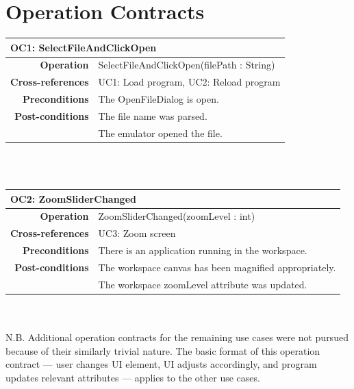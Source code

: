\documentclass[12pt]{article}
\begin{document}
\section{Operation Contracts}
\begin{tabular*}{\textwidth}{r | l}
  \multicolumn{2}{l}{\textbf{OC1: SelectFileAndClickOpen}} \\ \hline
  \textbf{Operation} & SelectFileAndClickOpen(filePath : String) \\
  \textbf{Cross-references} & UC1: Load  program, UC2: Reload program \\
  \textbf{Preconditions} & The OpenFileDialog is open. \\
  \textbf{Post-conditions} & The file name was parsed. \\
                            & The emulator opened the file. \\ \hline
\end{tabular*} \\\\

\begin{tabular*}{\textwidth}{r | l}
  \multicolumn{2}{l}{\textbf{OC2: ZoomSliderChanged}} \\ \hline
  \textbf{Operation} & ZoomSliderChanged(zoomLevel : int) \\
  \textbf{Cross-references} & UC3: Zoom screen \\
  \textbf{Preconditions} & There is an application running in the workspace. \\
  \textbf{Post-conditions} & The workspace canvas has been magnified appropriately. \\
                           & The workspace zoomLevel attribute was updated. \\ \hline
\end{tabular*} \\\\

N.B. Additional operation contracts for the remaining use cases were not pursued because of their similarly trivial nature. The basic format of this operation contract --- user changes UI element, UI adjusts accordingly, and program updates relevant attributes --- applies to the other use cases.
\end{document}
